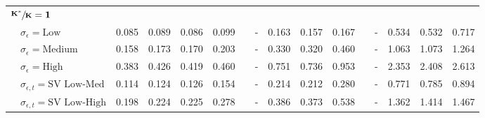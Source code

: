 \begin{table}[!tbp]
\begin{center}
\begin{tabular}{lllllcllllcllll}
\hline
{\bfseries $\mathbf{\sfrac{K^*}{K}=1}$}&&&&&&&&&&&&&&\tabularnewline
~~$\sigma_{\epsilon} =\text{Low}$& 0.085& 0.089& 0.086& 0.099&&-& 0.163& 0.157& 0.167&&-& 0.534& 0.532& 0.717\tabularnewline
~~$\sigma_{\epsilon} =\text{Medium}$& 0.158& 0.173& 0.170& 0.203&&-& 0.330& 0.320& 0.460&&-& 1.063& 1.073& 1.264\tabularnewline
~~$\sigma_{\epsilon} =\text{High}$& 0.383& 0.426& 0.419& 0.460&&-& 0.751& 0.736& 0.953&&-& 2.353& 2.408& 2.613\tabularnewline
~~$\sigma_{\epsilon,t} = \text{SV Low-Med}$& 0.114& 0.124& 0.126& 0.154&&-& 0.214& 0.212& 0.280&&-& 0.771& 0.785& 0.894\tabularnewline
~~$\sigma_{\epsilon,t}  = \text{SV Low-High}$& 0.198& 0.224& 0.225& 0.278&&-& 0.386& 0.373& 0.538&&-& 1.362& 1.414& 1.467\tabularnewline
\hline
\end{tabular}\end{center}
\end{table}
